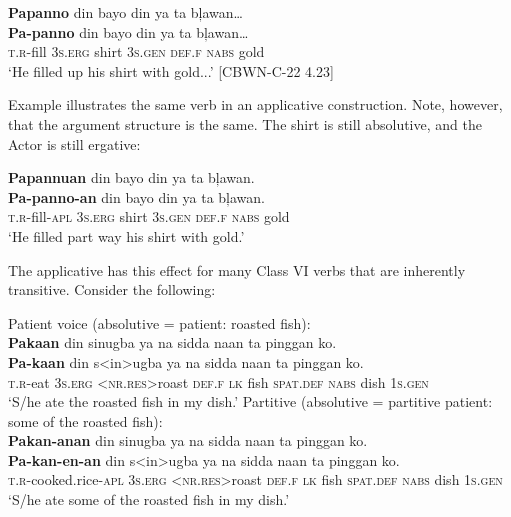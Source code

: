 \ea
\label{bkm:Ref395171869}
\textbf{Papanno}  din  bayo  din  ya  ta  bļawan… \\\smallskip
\gll \textbf{Pa-panno}  din  bayo  din  ya  ta  bļawan… \\
\textsc{t.r}-fill  3\textsc{s.erg}  shirt  3\textsc{s.gen}  \textsc{def.f}  \textsc{nabs}  gold \\
\glt ‘He filled up his shirt with gold...’ [CBWN-C-22 4.23]
\z

Example  illustrates the same verb in an applicative construction. Note, however, that the argument structure is the same. The shirt is still absolutive, and the Actor is still ergative:

\ea
\label{bkm:Ref395171874v}
\textbf{Papannuan}  din  bayo  din  ya  ta  bļawan. \\\smallskip
\gll \textbf{Pa-panno-an}  din  bayo  din  ya  ta  bļawan. \\
\textsc{t.r}-fill-\textsc{apl}  3\textsc{s.erg}  shirt  3\textsc{s.gen}  \textsc{def.f}  \textsc{nabs}  gold \\
\glt ‘He filled part way his shirt with gold.’
\z

The applicative has this effect for many Class VI verbs that are inherently transitive. Consider the following:

\ea
    \ea 
    Patient voice (absolutive = patient: roasted fish): \\
    \textbf{Pakaan}  din  sinugba  ya  na  sidda  naan  ta  pinggan  ko. \\\smallskip
\gll \textbf{Pa-kaan}  din  s<in>ugba  ya  na  sidda  naan  ta  pinggan  ko. \\
    \textsc{t.r}-eat  3\textsc{s.erg}  <\textsc{nr.res}>roast  \textsc{def.f}  \textsc{lk} fish  \textsc{spat.def}  \textsc{nabs} dish  1\textsc{s.gen} \\
    \glt ‘S/he ate the roasted fish in my dish.’
    \ex
    Partitive (absolutive = partitive patient: some of the roasted fish): \\
    \textbf{Pakan-anan}  din  sinugba  ya  na  sidda naan ta pinggan  ko.\\\smallskip
\gll \textbf{Pa-kan-en-an}  din  s<in>ugba  ya  na  sidda naan ta pinggan  ko.\\
    \textsc{t.r}-cooked.rice-\textsc{apl}  3\textsc{s.erg}  <\textsc{nr.res}>roast  \textsc{def.f}  \textsc{lk} fish
    \textsc{spat.def} \textsc{nabs}  dish  1\textsc{s.gen} \\
    \glt `S/he ate some of the roasted fish in my dish.’
    \z
\z

